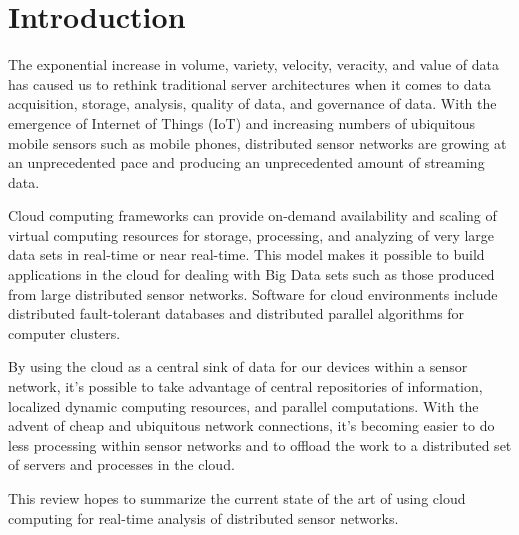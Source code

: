 \chapter{Introduction}
The exponential increase in volume, variety, velocity, veracity, and value of data has caused us to rethink traditional server architectures when it comes to data acquisition, storage, analysis, quality of data, and governance of data. With the emergence of Internet of Things (IoT) and increasing numbers of ubiquitous mobile sensors such as mobile phones, distributed sensor networks are growing at an unprecedented pace and producing an unprecedented amount of streaming data.

Cloud computing frameworks can provide on-demand availability and scaling of virtual computing resources for storage, processing, and analyzing of very large data sets in real-time or near real-time. This model makes it possible to build applications in the cloud for dealing with Big Data sets such as those produced from large distributed sensor networks. Software for cloud environments include distributed fault-tolerant databases and distributed parallel algorithms for computer clusters. 

By using the cloud as a central sink of data for our devices within a sensor network, it's possible to take advantage of central repositories of information, localized dynamic computing resources, and parallel computations. With the advent of cheap and ubiquitous network connections, it's becoming easier to do less processing within sensor networks and to offload the work to a distributed set of servers and processes in the cloud\cite{kamburugamuve_framework_2015}.

This review hopes to summarize the current state of the art of using cloud computing for real-time analysis of distributed sensor networks. 
